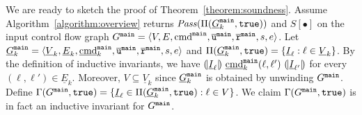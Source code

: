 We are ready to sketch the proof of Theorem~\ref{theorem:soundness}. 
Assume Algorithm~\ref{algorithm:overview} returns $\mathit{Pass} (\Pi (\underline{G}^{\mathtt{{main}}}_k, \mathtt{true}))$ and $S[\bullet]$ on the input control flow graph $G^{\mathtt{{main}}} =
\langle V, E, \textmd{cmd}^{\mathtt{{main}}}, \overline{\mathtt{u}}^{\mathtt{{main}}}, \overline{\mathtt{r}}^{\mathtt{{main}}},s,e \rangle$. Let $\underline{G}^{\mathtt{{main}}}_k = \langle \underline{V}_k, \underline{E}_k,
\underline{\textmd{cmd}}_k^{\mathtt{{main}}} , \overline{\mathtt{u}}^{\mathtt{{main}}}, \overline{\mathtt{r}}^{\mathtt{{main}}},s,e \rangle$ and $\Pi (\underline{G}^{\mathtt{{main}}}_k, \mathtt{true}) = \{ \underline{I}_{\ell}
: \ell \in \underline{V}_k \}$. By the definition of inductive invariants, we have
$\assert{\underline{I}_{\ell}}\ \underline{\textmd{cmd}}_k^\fun{main} (\ell, \ell')\ \assert{\underline{I}_{\ell'}}$
for every $(\ell, \ell') \in  \underline{E}_k$. Moreover, $V \subseteq  \underline{V}_k$ since
$\underline{G}^{\mathtt{{main}}}_k$ is obtained by unwinding $G^{\mathtt{{main}}}$. Define 
$\Gamma (G^{\mathtt{{main}}}, \mathtt{true}) = \{ \underline{I}_{\ell} \in \Pi (\underline{G}^{\mathtt{{main}}}_k,
\mathtt{true}) : \ell \in V \}$. We claim $\Gamma (G^{\mathtt{{main}}}, \mathtt{true})$
is in fact an inductive invariant for $G^{\mathtt{{main}}}$. 

